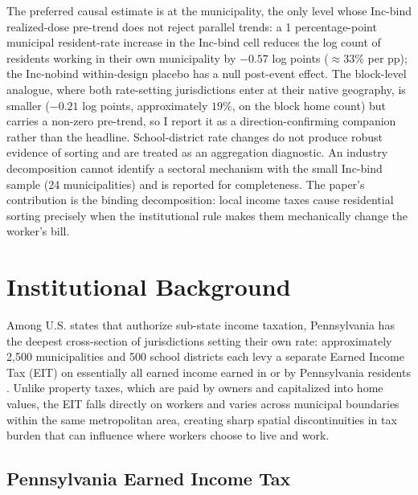 \documentclass[12pt]{article}
\begin{document}
The preferred causal estimate is at the municipality, the only level
whose Inc-bind realized-dose pre-trend does not reject parallel trends:
a 1 percentage-point municipal resident-rate increase in the Inc-bind
cell reduces the log count of residents working in their own
municipality by $-0.57$ log points ($\approx 33\%$ per pp); the
Inc-nobind within-design placebo has a null post-event effect. The
block-level analogue, where both rate-setting jurisdictions enter at
their native geography, is smaller ($-0.21$ log points, approximately
$19\%$, on the block home count) but carries a non-zero pre-trend, so
I report it as a direction-confirming companion rather than the headline. School-district rate
changes do not produce robust evidence of sorting and are treated as
an aggregation diagnostic. An industry decomposition cannot identify
a sectoral mechanism with the small Inc-bind sample (24
municipalities) and is reported for completeness. The paper's
contribution is the binding decomposition: local income
taxes cause residential sorting precisely when the institutional
rule makes them mechanically change the worker's bill.

\section{Institutional Background}
\label{sec:background}

Among U.S. states that authorize sub-state income taxation,
Pennsylvania has the deepest cross-section of jurisdictions setting
their own rate: approximately 2{,}500 municipalities and 500 school
districts each levy a separate Earned Income Tax (EIT) on essentially
all earned income earned in or by Pennsylvania residents
\citep{bagchiEffectsIntroducingWithholding2022,agrawalLessonsStateLocal}.
Unlike property taxes, which are paid by owners and capitalized into
home values, the EIT falls directly on workers and varies across
municipal boundaries within the same metropolitan area, creating
sharp spatial discontinuities in tax burden that can influence where
workers choose to live and work.

\subsection{Pennsylvania Earned Income Tax}
\label{subsec:pennsylvania}
\end{document}
